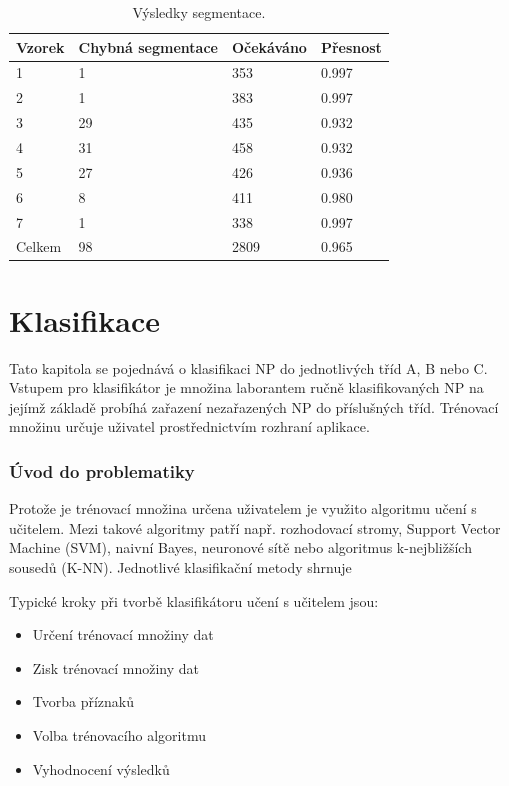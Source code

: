 \documentclass[11pt,twoside,a4paper,table]{book}
\begin{document}
\begin{table}[htp]
\centering
\begin{tabular}{|l|l|l|l|}
\hline
\rowcolor[HTML]{C0C0C0} 
Vzorek & Chybná segmentace & Očekáváno & Přesnost \\ \hline
1      & 1                 & 353       & 0.997    \\ \hline
2      & 1                 & 383       & 0.997    \\ \hline
3      & 29                & 435       & 0.932    \\ \hline
4      & 31                & 458       & 0.932    \\ \hline
5      & 27                & 426       & 0.936    \\ \hline
6      & 8                 & 411       & 0.980    \\ \hline
7      & 1                 & 338       & 0.997    \\ \hline
Celkem & 98                & 2809      & 0.965    \\ \hline
\end{tabular}
\caption{Výsledky segmentace.}
\label{tab:segment_results}
\end{table}

\chapter{Klasifikace}
\label{sec:klasifikace}
Tato kapitola se pojednává o klasifikaci NP do jednotlivých tříd A, B nebo C. Vstupem pro klasifikátor je množina laborantem ručně klasifikovaných NP na jejímž základě probíhá zařazení nezařazených NP do příslušných tříd. Trénovací množinu určuje uživatel prostřednictvím rozhraní aplikace.

\subsection{Úvod do problematiky}
Protože je trénovací množina určena uživatelem je využito algoritmu učení s učitelem. Mezi takové algoritmy patří např. rozhodovací stromy, Support Vector Machine (SVM), naivní Bayes, neuronové sítě nebo algoritmus k-nejbližších sousedů (K-NN). Jednotlivé klasifikační metody shrnuje \cite{book:pattern_class}

Typické kroky při tvorbě klasifikátoru učení s učitelem jsou:
\begin{itemize}
\item Určení trénovací množiny dat
\item Zisk trénovací množiny dat
\item Tvorba příznaků
\item Volba trénovacího algoritmu
\item Vyhodnocení výsledků
\end{itemize}
\end{document}
